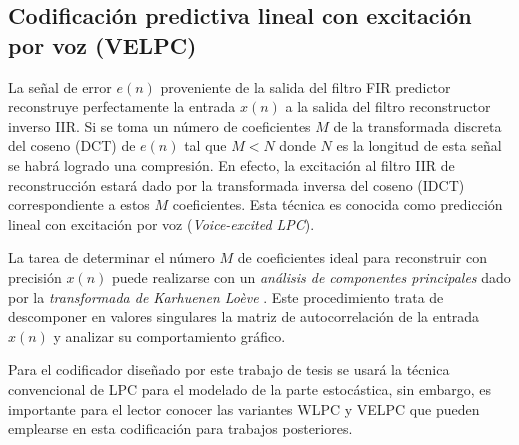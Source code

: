 \subsection{Codificación predictiva lineal con excitación por voz (VELPC)}
La señal de error $e(n)$ proveniente de la salida del filtro FIR predictor reconstruye perfectamente la entrada $x(n)$ a la salida del filtro reconstructor inverso IIR. Si se toma un número de coeficientes $M$ de la transformada discreta del coseno (DCT) de $e(n)$ tal que $M < N$ donde $N$ es la longitud de esta señal se habrá logrado una compresión. En efecto, la excitación al filtro IIR de reconstrucción estará dado por la transformada inversa del coseno (IDCT) correspondiente a estos $M$ coeficientes. Esta técnica es conocida como predicción lineal con excitación por voz (\emph{Voice-excited LPC}).

La tarea de determinar el número $M$ de coeficientes ideal para reconstruir con precisión $x(n)$ puede realizarse con un \emph{análisis de componentes principales} dado por la \emph{transformada de Karhuenen Loève} \cite[]{Jayant1974}. 
Este procedimiento trata de descomponer en valores singulares la matriz de autocorrelación de la entrada $x(n)$ y analizar su comportamiento gráfico. 

Para el codificador diseñado por este trabajo de tesis se usará la técnica convencional de LPC para el modelado de la parte estocástica, sin embargo, es importante para el lector conocer las variantes WLPC y VELPC que pueden emplearse en esta codificación para trabajos posteriores.



